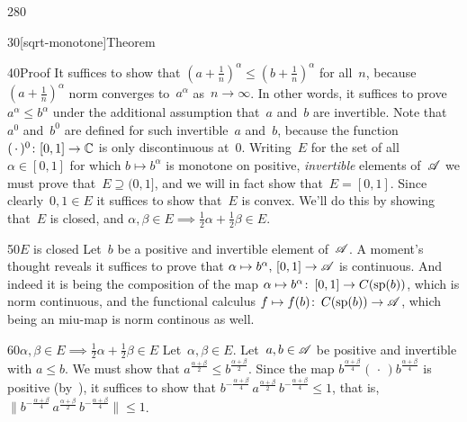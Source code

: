 \begin{parsec}{280}
\begin{point}{30}[sqrt-monotone]{Theorem}
\begin{point}{40}{Proof}
It suffices to show that
$(a+\frac{1}{n})^\alpha \leq (b+\frac{1}{n})^\alpha$
for all~$n$,
because~$(a+\frac{1}{n})^\alpha$
norm converges to~$a^\alpha$
as~$n\to\infty$.
In other words,
it suffices to prove $a^\alpha \leq b^\alpha$
under the additional assumption that~$a$ and~$b$ are invertible.
Note that~$a^0$ and~$b^0$ are defined for such
invertible~$a$ and~$b$,
because the
function~$(\,\cdot\,)^0\colon [0,1]\to\mathbb{C}$
is only discontinuous at~$0$.
Writing~$E$ for the set of all~$\alpha\in[0,1]$
for which $b\mapsto b^\alpha$ is monotone
on positive,
\emph{invertible} elements of~$\mathscr{A}$
we must prove that~$E\supseteq(0,1]$,
and we will in fact show that~$E=[0,1]$.
Since clearly~$0,1\in E$
it suffices to show that~$E$ is convex.
We'll do this by showing that~$E$
is closed,
and $\alpha,\beta\in E\implies \frac{1}{2}\alpha 
+ \frac{1}{2}\beta \in E$.
\begin{point}{50}{$E$ is closed}
Let~$b$ be a positive and invertible element of~$\mathscr{A}$.
A moment's thought reveals it suffices to 
prove that $\alpha\mapsto b^\alpha, \,[0,1]\to\mathscr{A}$
is continuous.
And indeed it is
being
the composition of the map $\alpha \mapsto b^\alpha\colon\,[0,1]
\to C(\mathrm{sp}(b))$, 
	which is norm continuous,
and the functional
	calculus $f\mapsto f(b)\colon\,
	C(\mathrm{sp}(b))\to \mathscr{A}$, which being an miu-map is norm continous
	as well.
\end{point}
\begin{point}{60}{$\alpha,\beta\in E\implies \frac{1}{2}\alpha+\frac{1}{2}\beta
	\in E$}
Let~$\alpha,\beta\in E$. Let~$a,b\in\mathscr{A}$ be positive
and invertible with $a\leq b$.
We must show that $a^{\frac{\alpha+\beta}{2}}\leq 
b^{\frac{\alpha+\beta}{2}}$.
Since the map $b^{\frac{\alpha+\beta}{4}}(\,\cdot\,)
b^{\frac{\alpha+\beta}{4}}$
is positive (by~),
it suffices to show that
$b^{-\frac{\alpha+\beta}{4}}\,a^{\frac{\alpha+\beta}{2}}\,
b^{-\frac{\alpha+\beta}{4}} \leq 1$,
that is, 
$\|b^{-\frac{\alpha+\beta}{4}}\,a^{\frac{\alpha+\beta}{2}}\,
b^{-\frac{\alpha+\beta}{4}} \| \leq 1$.


\end{point}
\end{point}
\end{point}
\end{parsec}
